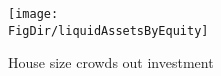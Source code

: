 \begin{figure}[h]
	\centering
	\texttt{[image: \\FigDir/liquidAssetsByEquity]}
	\caption{House size crowds out investment}
	\label{fig:liquidAssetsByEquity}
\end{figure}

